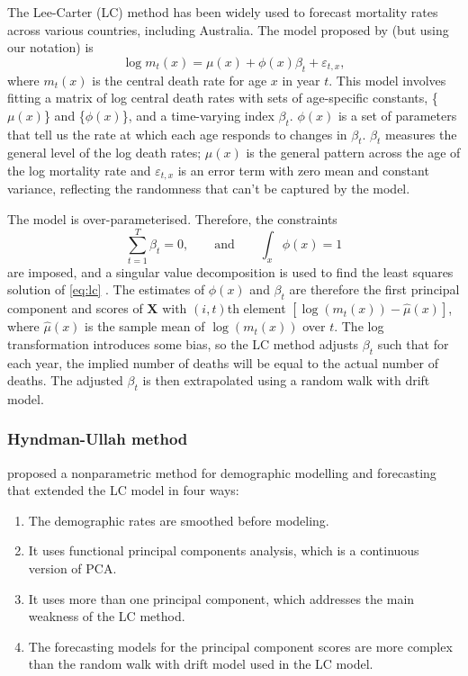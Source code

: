 \documentclass[
  doublespace]{anzsauth}
\providecommand{\tightlist}{%
  \setlength{\itemsep}{0pt}\setlength{\parskip}{0pt}}
\begin{document}
The Lee-Carter (LC) method has been widely used to forecast mortality rates across various countries, including Australia. The model proposed by \citet{LC92} (but using our notation) is
\begin{equation}\label{eq:lc}
  \log m_{t}(x)=\mu(x)+\phi(x)\beta_{t}+\varepsilon_{t,x},
\end{equation}
where \(m_{t}(x)\) is the central death rate for age \(x\) in year \(t\). This model involves fitting a matrix of log central death rates with sets of age-specific constants, \{\(\mu(x)\)\} and \{\(\phi(x)\)\}, and a time-varying index \(\beta_{t}\). \(\phi(x)\) is a set of parameters that tell us the rate at which each age responds to changes in \(\beta_{t}\). \(\beta_{t}\) measures the general level of the log death rates; \(\mu(x)\) is the general pattern across the age of the log mortality rate and \(\varepsilon_{t,x}\) is an error term with zero mean and constant variance, reflecting the randomness that can't be captured by the model.

The model is over-parameterised. Therefore, the constraints
\begin{equation}
  \sum_{t=1}^{T}\beta_t=0, \qquad\text{and}\qquad \int_x \phi(x)=1
\end{equation}
are imposed, and a singular value decomposition is used to find the least squares solution of \eqref{eq:lc} \citep{Good1969}. The estimates of \(\phi(x)\) and \(\beta_t\) are therefore the first principal component and scores of \(\bm{X}\) with \((i,t)\)th element \([\log(m_{t}(x))-\widehat\mu(x)]\), where \(\widehat\mu(x)\) is the sample mean of \(\log(m_{t}(x))\) over \(t\). The log transformation introduces some bias, so the LC method adjusts \(\beta_t\) such that for each year, the implied number of deaths will be equal to the actual number of deaths. The adjusted \(\beta_t\) is then extrapolated using a random walk with drift model.

\hypertarget{hyndman-ullah-method}{%
\subsubsection*{\texorpdfstring{Hyndman-Ullah method \label{sec:HU}}{Hyndman-Ullah method }}\label{hyndman-ullah-method}}

\citet{HU07} proposed a nonparametric method for demographic modelling and forecasting that extended the LC model in four ways:

\begin{enumerate}
\def\labelenumi{\arabic{enumi}.}
\tightlist
\item
  The demographic rates are smoothed before modeling.
\item
  It uses functional principal components analysis, which is a continuous version of PCA.
\item
  It uses more than one principal component, which addresses the main weakness of the LC method.
\item
  The forecasting models for the principal component scores are more complex than the random walk with drift model used in the LC model.
\end{enumerate}
\end{document}
